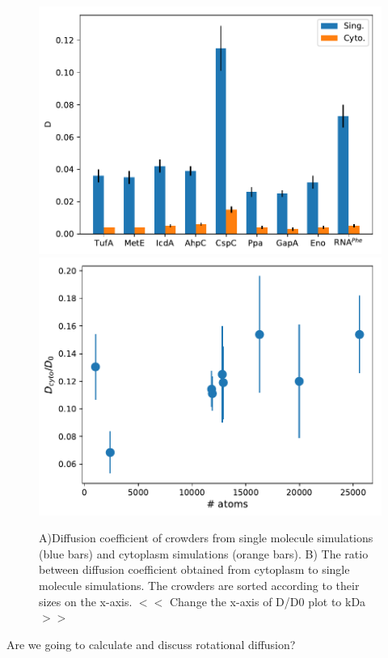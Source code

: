 \documentclass[journal=jacsat,manuscript=article]{achemso}
\begin{document}
\begin{figure}[H]
\includegraphics[scale=0.5]{msd.pdf}
\includegraphics[scale=0.5]{diff_cyto_over_singles.pdf}
\caption{A)Diffusion coefficient of crowders from single molecule simulations (blue bars) and cytoplasm simulations (orange bars). B) The ratio between diffusion coefficient obtained from cytoplasm to single molecule simulations. The crowders are sorted according to their sizes on the x-axis. \colorbox{blue!50}{ $<<$ Change the x-axis of D/D0 plot to kDa $>>$ }}
\label{fig:translational_diffusion}
\end{figure}

\colorbox{green!50}{ Are we going to calculate and discuss rotational diffusion? }
\end{document}
